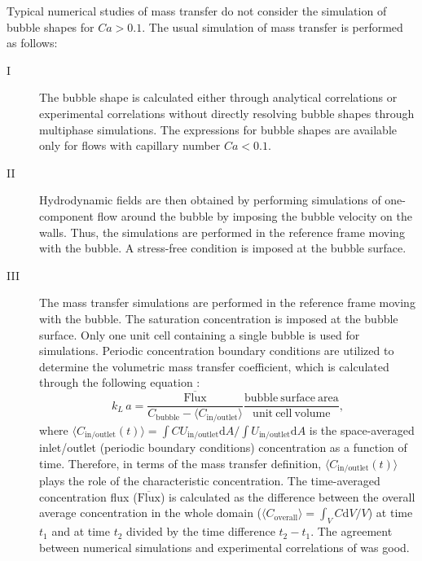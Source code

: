 \documentclass{article}
\newcommand{\vol}{k_L\,a}
\newcommand{\uinoutlet}{U_{\mathrm{in/outlet}}}
\newcommand{\cbubble}{C_{\mathrm{bubble}}}
\newcommand{\cinoutlet}{C_{\mathrm{in/outlet}}}
\newcommand{\coverall}{C_{\mathrm{overall}}}
\begin{document}
Typical numerical studies of mass transfer
\cite{kreutzer-overview,vanbaten-circular} do not consider the simulation of
bubble shapes for $Ca>0.1$. The usual simulation of mass transfer is performed as
follows: 
\begin{description}
 \item[I] The bubble shape is calculated either
through analytical correlations \cite{bretherton} or experimental correlations
\cite{cerro-bubble-train} without directly resolving bubble shapes through
multiphase simulations.  The expressions for bubble shapes are available only
for flows with capillary number $Ca<0.1$.
  \item[II] Hydrodynamic fields
are then obtained by performing simulations of one-component flow around the
bubble by imposing the bubble velocity on the walls. Thus, the simulations are
performed in the reference frame moving with the bubble. A stress-free
condition is imposed at the bubble surface.
  \item[III]  The mass transfer
simulations are performed in the reference frame moving with the bubble. The
saturation concentration is imposed at the bubble surface. Only one unit cell
containing a single bubble is used for simulations. Periodic concentration boundary conditions are
utilized to determine the volumetric mass transfer coefficient, which is
calculated through the following equation \cite{vanbaten-circular}:
\begin{equation} \label{main:simulation:equation}
\vol=\frac{\mathrm{\overline{Flux}}}{\cbubble-\langle\cinoutlet\rangle}
\frac{\mathrm{bubble\ surface\ area}}{\mathrm{unit\ cell\ volume}},
\end{equation}
 where $\langle\cinoutlet(t)\rangle=\int{C \uinoutlet
\mathrm{d}A}/\int{\uinoutlet\mathrm{d}A}$ is the space-averaged inlet/outlet (periodic boundary conditions)
concentration as a function of time. Therefore, in terms of the mass transfer definition, $\langle\cinoutlet(t)\rangle$ plays the role of the 
characteristic concentration.
The time-averaged
concentration flux ($\mathrm{\overline{Flux}}$) is calculated as the difference
between the overall average concentration in the whole domain
($\langle\coverall\rangle=\int_{V} C \mathrm{d}V /V$) at time $t_1$ and at time
$t_2$ divided by the time difference $t_2-t_1$. The agreement between numerical
simulations \cite{vanbaten-circular} and experimental correlations of \citet{bercic-mass}
was good. 
 \end{description}
\end{document}

